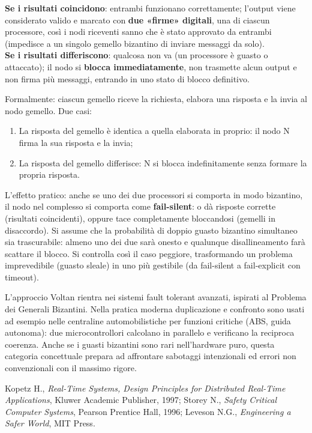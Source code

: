\textbf{Se i risultati coincidono}: entrambi funzionano correttamente; l'output viene considerato valido e marcato con \textbf{due «firme» digitali}, una di ciascun processore, così i nodi riceventi sanno che è stato approvato da entrambi (impedisce a un singolo gemello bizantino di inviare messaggi da solo).\\
\textbf{Se i risultati differiscono}: qualcosa non va (un processore è guasto o attaccato); il nodo si \textbf{blocca immediatamente}, non trasmette alcun output e non firma più messaggi, entrando in uno stato di blocco definitivo.

Formalmente: ciascun gemello riceve la richiesta, elabora una risposta e la invia al nodo gemello. Due casi:
\begin{enumerate}
    \item[A.] La risposta del gemello è identica a quella elaborata in proprio: il nodo N firma la sua risposta e la invia;
    \item[B.] La risposta del gemello differisce: N si blocca indefinitamente senza formare la propria risposta.
\end{enumerate}

L'effetto pratico: anche se uno dei due processori si comporta in modo bizantino, il nodo nel complesso si comporta come \textbf{fail-silent}: o dà risposte corrette (risultati coincidenti), oppure tace completamente bloccandosi (gemelli in disaccordo). Si assume che la probabilità di doppio guasto bizantino simultaneo sia trascurabile: almeno uno dei due sarà onesto e qualunque disallineamento farà scattare il blocco. Si controlla così il caso peggiore, trasformando un problema imprevedibile (guasto sleale) in uno più gestibile (da fail-silent a fail-explicit con timeout).

\begin{note}
L'approccio Voltan rientra nei sistemi fault tolerant avanzati, ispirati al Problema dei Generali Bizantini. Nella pratica moderna duplicazione e confronto sono usati ad esempio nelle centraline automobilistiche per funzioni critiche (ABS, guida autonoma): due microcontrollori calcolano in parallelo e verificano la reciproca coerenza. Anche se i guasti bizantini sono rari nell'hardware puro, questa categoria concettuale prepara ad affrontare sabotaggi intenzionali ed errori non convenzionali con il massimo rigore.
\end{note}

\begin{note}[Bibliografia]
Kopetz H., \emph{Real-Time Systems, Design Principles for Distributed Real-Time Applications}, Kluwer Academic Publisher, 1997; Storey N., \emph{Safety Critical Computer Systems}, Pearson Prentice Hall, 1996; Leveson N.G., \emph{Engineering a Safer World}, MIT Press.
\end{note}
